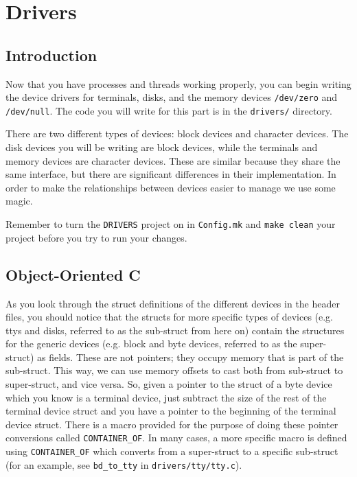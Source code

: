 \chapter{Drivers}

\label{kern2}

\section{Introduction}
Now that you have processes and threads working properly, you can begin writing the device drivers for terminals, disks, and the memory devices \texttt{/dev/zero} and \texttt{/dev/null}. The code you will write for this part is in the \texttt{drivers/} directory. 

There are two different types of devices: block devices and character devices. The disk devices you will be writing are block devices, while the terminals and memory devices are character devices. These are similar because they share the same interface, but there are significant differences in their implementation. In order to make the relationships between devices easier to manage we use some magic.

Remember to turn the \texttt{DRIVERS} project on in \texttt{Config.mk} and \texttt{make clean} your project before you try to run your changes.

\section{Object-Oriented C}
As you look through the struct definitions of the different devices in the header files, you should notice that the structs for more specific types of devices (e.g. ttys and disks, referred to as the sub-struct from here on) contain the structures for the generic devices (e.g. block and byte devices, referred to as the super-struct) as fields. These are not pointers; they occupy memory that is part of the sub-struct. This way, we can use memory offsets to cast both from sub-struct to super-struct, and vice versa. So, given a pointer to the struct of a byte device which you know is a terminal device, just subtract the size of the rest of the terminal device struct and you have a pointer to the beginning of the terminal device struct. There is a macro provided for the purpose of doing these pointer conversions called \texttt{CONTAINER\_OF}. In many cases, a more specific macro is defined using \texttt{CONTAINER\_OF} which converts from a super-struct to a specific sub-struct (for an example, see \texttt{bd\_to\_tty} in \texttt{drivers/tty/tty.c}).

